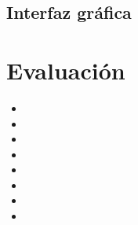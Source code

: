 \documentclass[letterpaper,12pt]{article}
\begin{document}
\subsection{Interfaz gráfica}



\section{Evaluación}
\begin{itemize}
\item %
\item %
\item %
\item %
\item %
\item %
\item %
\item %
\end{itemize}
\end{document}

